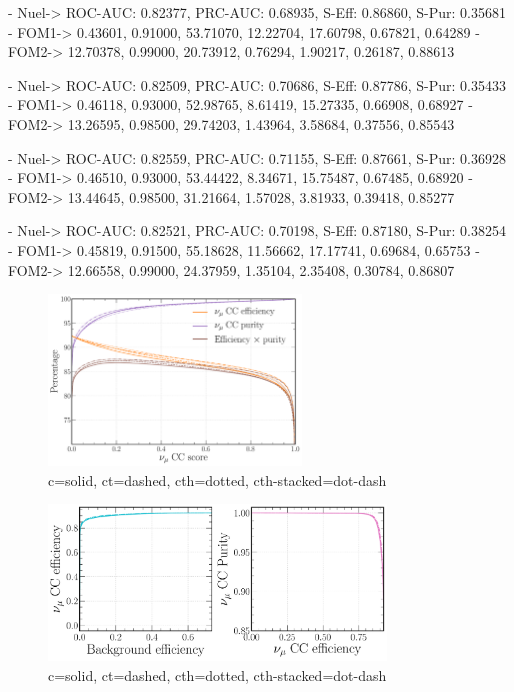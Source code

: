 - Nuel-> ROC-AUC: 0.82377, PRC-AUC: 0.68935, S-Eff: 0.86860, S-Pur: 0.35681
- FOM1-> 0.43601, 0.91000, 53.71070, 12.22704, 17.60798, 0.67821, 0.64289
- FOM2-> 12.70378, 0.99000, 20.73912, 0.76294, 1.90217, 0.26187, 0.88613

- Nuel-> ROC-AUC: 0.82509, PRC-AUC: 0.70686, S-Eff: 0.87786, S-Pur: 0.35433
- FOM1-> 0.46118, 0.93000, 52.98765, 8.61419, 15.27335, 0.66908, 0.68927
- FOM2-> 13.26595, 0.98500, 29.74203, 1.43964, 3.58684, 0.37556, 0.85543

- Nuel-> ROC-AUC: 0.82559, PRC-AUC: 0.71155, S-Eff: 0.87661, S-Pur: 0.36928
- FOM1-> 0.46510, 0.93000, 53.44422, 8.34671, 15.75487, 0.67485, 0.68920
- FOM2-> 13.44645, 0.98500, 31.21664, 1.57028, 3.81933, 0.39418, 0.85277

- Nuel-> ROC-AUC: 0.82521, PRC-AUC: 0.70198, S-Eff: 0.87180, S-Pur: 0.38254
- FOM1-> 0.45819, 0.91500, 55.18628, 11.56662, 17.17741, 0.69684, 0.65753
- FOM2-> 12.66558, 0.99000, 24.37959, 1.35104, 2.35408, 0.30784, 0.86807

\begin{figure} %
    \includegraphics[width=0.6\textwidth]{diagrams/6-cvn/chipsnet/channel_numu_eff_curves.pdf}
    \caption[channel numu eff curves short]
    {c=solid, ct=dashed, cth=dotted, cth-stacked=dot-dash}
    \label{fig:channel_numu_eff_curves}
\end{figure}

\begin{figure} %
    \includegraphics[width=0.8\textwidth]{diagrams/6-cvn/chipsnet/channel_numu_comp_curves.pdf}
    \caption[channel numu comp curves short]
    {c=solid, ct=dashed, cth=dotted, cth-stacked=dot-dash}
    \label{fig:channel_numu_comp_curves}
\end{figure}

